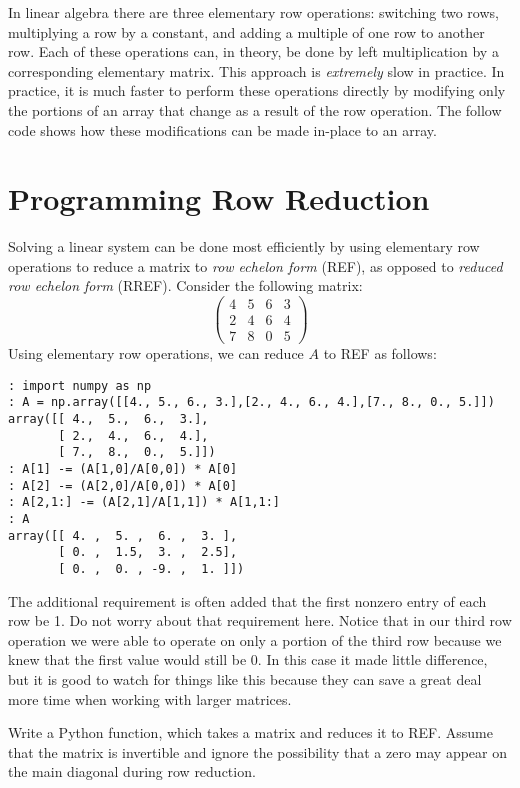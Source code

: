 \label{lab:LUdecomp}

In linear algebra there are three elementary row operations: switching two rows, multiplying a row by a constant, and adding a multiple of one row to another row.
Each of these operations can, in theory, be done by left multiplication by a corresponding elementary matrix.
This approach is \emph{extremely} slow in practice.
In practice, it is much faster to perform these operations directly by modifying only the portions of an array that change as a result of the row operation.
The follow code shows how these modifications can be made in-place to an array.


\section*{Programming Row Reduction}
Solving a linear system can be done most efficiently by using elementary row operations to reduce a matrix to \emph{row echelon form} (REF), as opposed to \emph{reduced row echelon form} (RREF).
Consider the following matrix: 
\[
\begin{pmatrix}
4&5&6&3 \\
2&4&6&4 \\
7&8&0&5
\end{pmatrix}
\]
Using elementary row operations, we can reduce $A$ to REF as follows:
\begin{lstlisting}
: import numpy as np
: A = np.array([[4., 5., 6., 3.],[2., 4., 6., 4.],[7., 8., 0., 5.]])
array([[ 4.,  5.,  6.,  3.],
       [ 2.,  4.,  6.,  4.],
       [ 7.,  8.,  0.,  5.]])
: A[1] -= (A[1,0]/A[0,0]) * A[0]
: A[2] -= (A[2,0]/A[0,0]) * A[0]
: A[2,1:] -= (A[2,1]/A[1,1]) * A[1,1:]
: A
array([[ 4. ,  5. ,  6. ,  3. ],
       [ 0. ,  1.5,  3. ,  2.5],
       [ 0. ,  0. , -9. ,  1. ]])
\end{lstlisting}
The additional requirement is often added that the first nonzero entry of each row be 1.
Do not worry about that requirement here.
Notice that in our third row operation we were able to operate on only a portion of the third row because we knew that the first value would still be 0.
In this case it made little difference, but it is good to watch for things like this because they can save a great deal more time when working with larger matrices.

\begin{problem}
\label{prob:REF}
Write a Python function, which takes a matrix and reduces it to REF.
Assume that the matrix is invertible and ignore the possibility that a zero may appear on the main diagonal during row reduction.
\end{problem}

